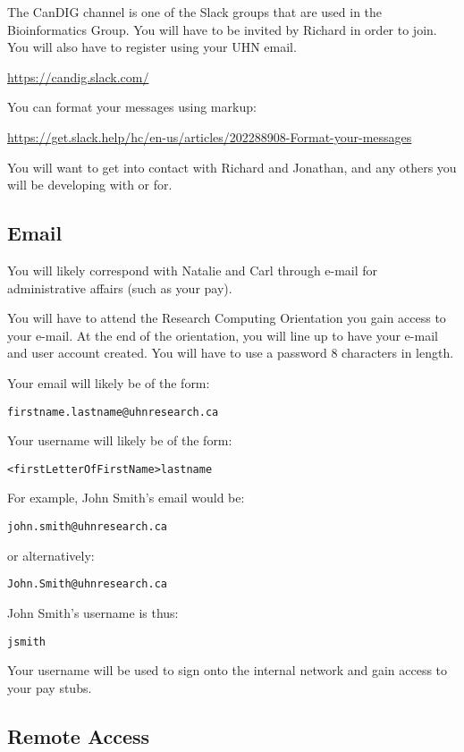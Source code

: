 \documentclass{article}
\begin{document}
The CanDIG channel is one of the Slack groups 
that are used in the Bioinformatics Group. You will
have to be invited by Richard in order to join.
You will also have to register using your UHN email.

\url{https://candig.slack.com/}

You can format your messages using markup:

\url{https://get.slack.help/hc/en-us/articles/202288908-Format-your-messages}

You will want to get into contact with Richard and Jonathan, 
and any others you will be developing with or for.

\subsection{Email}

You will likely correspond with Natalie and Carl through e-mail 
for administrative affairs (such as your pay).

You will have to attend the Research Computing Orientation
you gain access to your e-mail. At the end of the orientation,
you will line up to have your e-mail and user account created.
You will have to use a password 8 characters in length.

Your email will likely be of the form:
\begin{verbatim}
firstname.lastname@uhnresearch.ca
\end{verbatim}
Your username will likely be of the form:
\begin{verbatim}
<firstLetterOfFirstName>lastname
\end{verbatim}
For example, John Smith's email would be:
\begin{verbatim}
john.smith@uhnresearch.ca
\end{verbatim}
or alternatively:
\begin{verbatim}
John.Smith@uhnresearch.ca
\end{verbatim}
John Smith's username is thus:
\begin{verbatim}
jsmith
\end{verbatim}
Your username will be used to sign onto the internal network
and gain access to your pay stubs.

\subsection{Remote Access}
\end{document}
